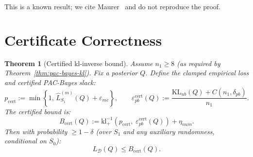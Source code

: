 \documentclass[11pt,a4paper]{article}
\newtheorem{theorem}{Theorem}
\newcommand{\kl}{\mathrm{kl}}
\newcommand{\KL}{\mathrm{KL}}
\newcommand{\cD}{\mathcal{D}}
\newcommand{\klinv}{\kl^{-1}_+}
\begin{document}
This is a known result; we cite Maurer~\cite{maurer2004} and do not reproduce the proof.

\section{Certificate Correctness}

\begin{theorem}[Certified kl-inverse bound]
\label{thm:certificate}
Assume $n_1 \ge 8$ (as required by Theorem~\ref{thm:pac-bayes-kl}). Fix a posterior $Q$. Define the clamped empirical loss and certified PAC-Bayes slack:
\[
p_{\mathrm{cert}} := \min\!\left\{1,\, \hat{L}_{S_1}^{(m)}(Q) + \varepsilon_{mc}\right\},
\qquad
\varepsilon_{pb}^{\mathrm{cert}}(Q) := \frac{\KL_{ub}(Q) + C(n_1, \delta_{pb})}{n_1}.
\]
The certified bound is:
\[
B_{\mathrm{cert}}(Q) := \klinv\!\left(p_{\mathrm{cert}},\; \varepsilon_{pb}^{\mathrm{cert}}(Q)\right) + \eta_{num}.
\]
Then with probability $\ge 1 - \delta$ (over $S_1$ and any auxiliary randomness, conditional on $S_0$):
\[
L_\cD(Q) \le B_{\mathrm{cert}}(Q).
\]
\end{theorem}
\end{document}
